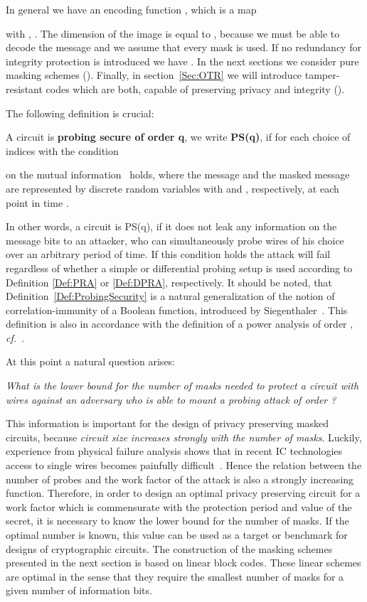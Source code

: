 \documentclass[11pt]{llncs}
\newcommand{\BDEF}{\begin{definition}}  \newcommand{\EDEF}{\end{definition}}
\newcommand{\cf}{{\it cf.\ }}
\begin{document}
In general we have an encoding function ,
which is a map

with ,  .
The dimension of the image is equal to , because we must be able to
decode the message and we assume that every mask is used.
If no redundancy for integrity protection is introduced we have .
In the next sections we consider pure masking schemes ().
Finally, in section~\ref{Sec:OTR} we will introduce
tamper-resistant codes which are both, capable of
preserving privacy and integrity ().

The following definition is crucial:
\BDEF\label{Def:ProbingSecurity}
A circuit is \textbf{probing secure of order q}, we write \textbf{PS(q)},
if for each choice of
indices  with 
the condition

on the mutual information~\cite{Cover2006ElementsofInformation} holds,
where the message  and the masked message  are
represented by discrete random variables
with 
and  ,
respectively, at each point in time .
\EDEF
In other words, a circuit is PS(q), if it does not leak any information
on the message bits  to an attacker,
who can simultaneously probe  wires  of his choice
over an arbitrary period of time.
If this condition holds the attack will fail regardless of
whether a simple or differential probing setup is used
according to Definition \ref{Def:PRA} or \ref{Def:DPRA}, respectively.
It should be noted, that Definition~\ref{Def:ProbingSecurity}
is a natural generalization of the
notion of correlation-immunity of a Boolean function, introduced
by Siegenthaler~\cite{Siegenthaler1984Correlation-immunityofnonlinear}.
This definition is also in accordance with the definition
of a power analysis of order , \cf\cite{Mangard2007PowerAnalysisAttacks}.

At this point a natural question arises:
\begin{center}
\begin{minipage}{0.83\textwidth}
 \em What is the lower bound for the number of masks needed to protect
     a circuit with  wires against an adversary who is able to
     mount a probing attack of order ?
 \end{minipage}
\end{center}
This information is important for the design of privacy preserving masked
circuits, because \emph{circuit size increases strongly with the number of masks}.
Luckily, experience from physical failure analysis shows that in recent
IC technologies access to single wires
becomes painfully difficult~\cite{Boit2008PhysicalTechniquesChip-Backside}.
Hence the relation between the number of probes and the work factor
of the attack is also a strongly increasing function.
Therefore, in order to design an optimal privacy preserving circuit for a work factor
which is commensurate with the protection period and value of the secret,
it is necessary to know the lower bound for the number of masks.
If the optimal number is known, this value can be used as a target or benchmark
for designs of cryptographic circuits.
The construction of the masking schemes presented in the next section
is based on linear block codes.
These linear schemes are optimal in the sense that they require the
smallest number of masks for a given number of information bits.
\end{document}

